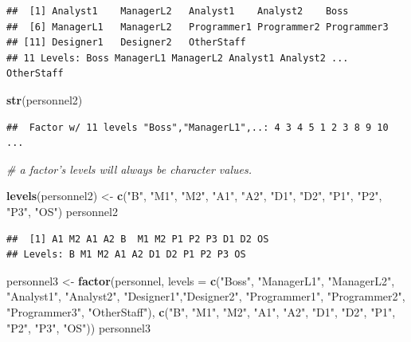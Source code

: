 \documentclass[]{book}
\newenvironment{Shaded}{\begin{snugshade}}{\end{snugshade}}
\newcommand{\KeywordTok}[1]{\textcolor[rgb]{0.13,0.29,0.53}{\textbf{{#1}}}}
\newcommand{\DataTypeTok}[1]{\textcolor[rgb]{0.13,0.29,0.53}{{#1}}}
\newcommand{\StringTok}[1]{\textcolor[rgb]{0.31,0.60,0.02}{{#1}}}
\newcommand{\CommentTok}[1]{\textcolor[rgb]{0.56,0.35,0.01}{\textit{{#1}}}}
\newcommand{\NormalTok}[1]{{#1}}
\begin{document}
\begin{verbatim}
##  [1] Analyst1    ManagerL2   Analyst1    Analyst2    Boss       
##  [6] ManagerL1   ManagerL2   Programmer1 Programmer2 Programmer3
## [11] Designer1   Designer2   OtherStaff 
## 11 Levels: Boss ManagerL1 ManagerL2 Analyst1 Analyst2 ... OtherStaff
\end{verbatim}

\begin{Shaded}
\begin{Highlighting}[]
\KeywordTok{str}\NormalTok{(personnel2)}
\end{Highlighting}
\end{Shaded}

\begin{verbatim}
##  Factor w/ 11 levels "Boss","ManagerL1",..: 4 3 4 5 1 2 3 8 9 10 ...
\end{verbatim}

\begin{Shaded}
\begin{Highlighting}[]
\CommentTok{# a factor's levels will always be character values.}

\KeywordTok{levels}\NormalTok{(personnel2) <-}\StringTok{ }\KeywordTok{c}\NormalTok{(}\StringTok{"B"}\NormalTok{, }\StringTok{"M1"}\NormalTok{, }\StringTok{"M2"}\NormalTok{, }\StringTok{"A1"}\NormalTok{, }\StringTok{"A2"}\NormalTok{, }\StringTok{"D1"}\NormalTok{, }\StringTok{"D2"}\NormalTok{, }\StringTok{"P1"}\NormalTok{, }\StringTok{"P2"}\NormalTok{, }\StringTok{"P3"}\NormalTok{, }\StringTok{"OS"}\NormalTok{)}
\NormalTok{personnel2}
\end{Highlighting}
\end{Shaded}

\begin{verbatim}
##  [1] A1 M2 A1 A2 B  M1 M2 P1 P2 P3 D1 D2 OS
## Levels: B M1 M2 A1 A2 D1 D2 P1 P2 P3 OS
\end{verbatim}

\begin{Shaded}
\begin{Highlighting}[]
\NormalTok{personnel3 <-}\StringTok{ }\KeywordTok{factor}\NormalTok{(personnel,}
                     \DataTypeTok{levels =} \KeywordTok{c}\NormalTok{(}\StringTok{"Boss"}\NormalTok{, }\StringTok{"ManagerL1"}\NormalTok{, }\StringTok{"ManagerL2"}\NormalTok{, }\StringTok{"Analyst1"}\NormalTok{, }\StringTok{"Analyst2"}\NormalTok{,  }\StringTok{"Designer1"}\NormalTok{,}\StringTok{"Designer2"}\NormalTok{, }\StringTok{"Programmer1"}\NormalTok{, }\StringTok{"Programmer2"}\NormalTok{, }\StringTok{"Programmer3"}\NormalTok{, }\StringTok{"OtherStaff"}\NormalTok{),}
                     \KeywordTok{c}\NormalTok{(}\StringTok{"B"}\NormalTok{, }\StringTok{"M1"}\NormalTok{, }\StringTok{"M2"}\NormalTok{, }\StringTok{"A1"}\NormalTok{, }\StringTok{"A2"}\NormalTok{, }\StringTok{"D1"}\NormalTok{, }\StringTok{"D2"}\NormalTok{, }\StringTok{"P1"}\NormalTok{, }\StringTok{"P2"}\NormalTok{, }\StringTok{"P3"}\NormalTok{, }\StringTok{"OS"}\NormalTok{))}
\NormalTok{personnel3}
\end{Highlighting}
\end{Shaded}
\end{document}
